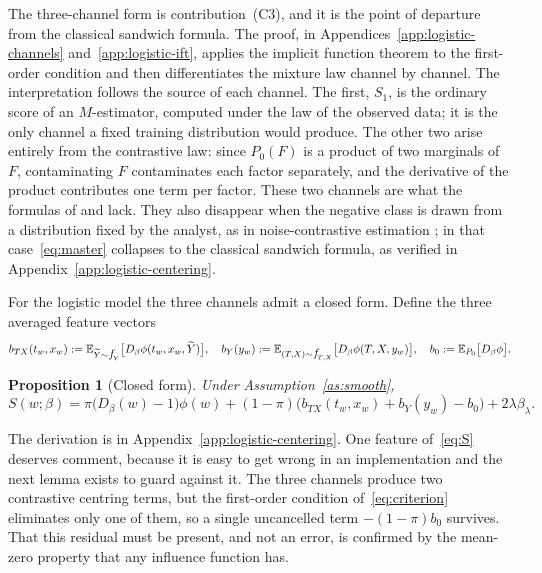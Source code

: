 \documentclass[11pt]{article}
\theoremstyle{plain}
\newtheorem{mypropo}{Proposition}
\theoremstyle{definition}
\theoremstyle{remark}
\newcommand{\pE}{\ensuremath{\mathbb{E}}}
\newcommand{\pf}[1]{\ensuremath{\,\mathlarger{\textit{f}}_{#1}}}
\newcommand{\ratio}{\ensuremath{\pi}}
\newcommand{\score}{S}
\begin{document}
The three-channel form is contribution~(C3), and it is the point of departure from the
classical sandwich formula. The proof, in Appendices~\ref{app:logistic-channels}
and~\ref{app:logistic-ift}, applies the implicit function theorem to the first-order condition
and then differentiates the mixture law channel by channel. The interpretation follows the
source of each channel. The first, $\score_1$, is the ordinary score of an $M$-estimator,
computed under the law of the observed data; it is the only channel a fixed training
distribution would produce. The other two arise entirely from the contrastive law: since
$P_0(F)$ is a product of two marginals of $F$, contaminating $F$ contaminates each factor
separately, and the derivative of the product contributes one term per factor. These two
channels are what the formulas of \citet{avella2017} and \citet{kohliang2017} lack. They also
disappear when the negative class is drawn from a distribution fixed by the analyst, as in
noise-contrastive estimation \citep{gutmann2010nce}; in that case~\eqref{eq:master} collapses
to the classical sandwich formula, as verified in Appendix~\ref{app:logistic-centering}.

For the logistic model the three channels admit a closed form. Define the three averaged
feature vectors
\begin{equation}
b_{TX}(t_w,x_w) := \pE_{\widetilde Y \sim \pf{Y}}\big[ D_\beta \phi (t_w,x_w,\widetilde Y) \big],
\quad
b_Y(y_w) := \pE_{(T,X) \sim \pf{T,X}}\big[ D_\beta \phi (T,X,y_w) \big],
\quad
b_0 := \pE_{P_0}\big[ D_\beta \phi \big].
\label{eq:b-channels}
\end{equation}

\begin{mypropo}[Closed form]
\label{prop:closed-form}
Under Assumption~\ref{as:smooth},
\begin{equation}
\score(w;\beta)
= \ratio\big( D_\beta(w) - 1 \big)\phi(w)
+ (1-\ratio)\Big( b_{TX}(t_w,x_w) + b_Y(y_w) - b_0 \Big)
+ 2\lambda\beta_\lambda .
\label{eq:S}
\end{equation}
\end{mypropo}

The derivation is in Appendix~\ref{app:logistic-centering}. One feature of~\eqref{eq:S}
deserves comment, because it is easy to get wrong in an implementation and the next lemma
exists to guard against it. The three channels produce two contrastive centring terms, but the
first-order condition of~\eqref{eq:criterion} eliminates only one of them, so a single
uncancelled term $-(1-\ratio)b_0$ survives. That this residual must be present, and not an
error, is confirmed by the mean-zero property that any influence function has.
\end{document}
